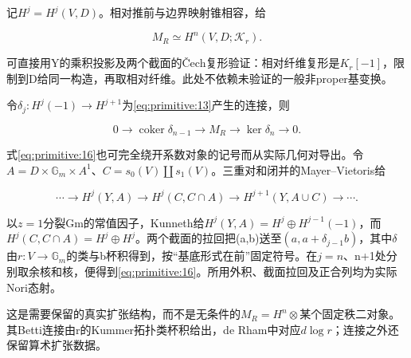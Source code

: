\documentclass[11pt,a4paper,oneside]{ctexrep}
\theoremstyle{cnplain}
\theoremstyle{definition}
\theoremstyle{remark}
\begin{document}
记\(H^j=H^j(V,D)\)。相对推前与边界映射锥相容，给

\begin{equation}
M_R\simeq H^n(V,D;\mathcal K_r).               \label{eq:primitive:15}
\end{equation}

可直接用Y的乘积投影及两个截面的Čech复形验证：相对纤维复形是\(K_r[- 1]\)，限制到D给同一构造，再取相对纤维。此处不依赖未验证的一般非proper基变换。

令\(\delta _j:H^j(-1)\to H^{j+1}\)为\eqref{eq:primitive:13}产生的连接，则

\begin{equation}
0\longrightarrow\operatorname{coker}\delta_{n-1}
       \longrightarrow M_R\longrightarrow\ker\delta_n\longrightarrow0.
                                                                    \label{eq:primitive:16}
\end{equation}

式\eqref{eq:primitive:16}也可完全绕开系数对象的记号而从实际几何对导出。令\(A=D\times \mathbb G_m\times A^{1}\)、\(C=s_0(V)\)\ensuremath{\coprod}\(s_1(V)\)。三重对和闭并的Mayer--Vietoris给

\begin{equation}
\cdots\to H^j(Y,A)\to H^j(C,C\cap A)
             \to H^{j+1}(Y,A\cup C)\to\cdots .
\end{equation}

以\(z=1\)分裂Gm的常值因子，Kunneth给\(H^j(Y,A)=H^j\oplus H^{j-1}(-1)\)，而\(H^j(C,C\cap A)=H^j\oplus H^j\)。两个截面的拉回把(a,b)送至\((a,a+\delta _{j-1}b)\)，其中\(\delta \)由\(r:V\to \mathbb G_m\)的类与b杯积得到，按``基底形式在前''固定符号。在\(j=n\)、n+1处分别取余核和核，便得到\eqref{eq:primitive:16}。所用外积、截面拉回及正合列均为实际Nori态射。

这是需要保留的真实扩张结构，而不是无条件的\(M_R=H^n\otimes \)某个固定秩二对象。其Betti连接由r的Kummer拓扑类杯积给出，de Rham中对应\(d\log  r\)；连接之外还保留算术扩张数据。
\end{document}
